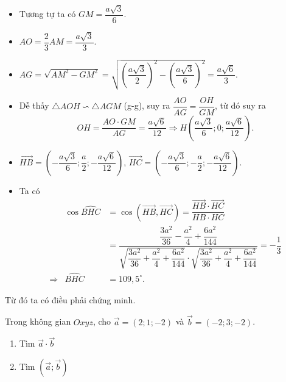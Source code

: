\begin{bt}
{\begin{itemize}
			\item Tương tự ta có $GM=\dfrac{a\sqrt{3}}{6}$.
			\item $AO = \dfrac{2}{3}AM = \dfrac{a\sqrt{3}}{3}$.
			\item $AG=\sqrt{AM^2-GM^2}=\sqrt{\left(\dfrac{a\sqrt{3}}{2}\right)^2-\left(\dfrac{a\sqrt{3}}{6}\right)^2}=\dfrac{a\sqrt{6}}{3}$.
			\item Dễ thấy $\triangle AOH \backsim \triangle AGM$ (g-g), suy ra $\dfrac{AO}{AG}=\dfrac{OH}{GM}$, từ đó suy ra 
			\[ OH = \dfrac{AO\cdot GM}{AG}=\dfrac{a\sqrt{6}}{12}\Rightarrow H\left(\dfrac{a\sqrt{3}}{6};0;\dfrac{a\sqrt{6}}{12}\right).\]
			\item $\overrightarrow{HB}=\left(-\dfrac{a\sqrt{3}}{6};\dfrac{a}{2};-\dfrac{a\sqrt{6}}{12}\right)$, $\overrightarrow{HC}=\left(-\dfrac{a\sqrt{3}}{6};-\dfrac{a}{2};-\dfrac{a\sqrt{6}}{12}\right)$.
			\item Ta có
			\begin{eqnarray*}
				& \cos \widehat{BHC} & =\cos \left(\overrightarrow{HB},\overrightarrow{HC}\right) = \dfrac{\overrightarrow{HB}\cdot \overrightarrow{HC}}{HB\cdot HC}\\
				& & = \dfrac{\dfrac{3a^2}{36}-\dfrac{a^2}{4}+\dfrac{6a^2}{144}}{\sqrt{\dfrac{3a^2}{36}+\dfrac{a^2}{4}+\dfrac{6a^2}{144}}\cdot \sqrt{\dfrac{3a^2}{36}+\dfrac{a^2}{4}+\dfrac{6a^2}{144}}} = -\dfrac{1}{3}\\
				\Rightarrow &  \widehat{BHC} & =109{,}5^\circ.
			\end{eqnarray*}
		\end{itemize}
		Từ đó ta có điều phải chứng minh.
	}
\end{bt}

\begin{bt}%
	Trong không gian $Oxyz$, cho $\overrightarrow{a}=(2;1;-2)$ và $\overrightarrow{b}=(-2;3;-2)$.
	\begin{enumerate}
		\item Tìm $\overrightarrow{a}\cdot\overrightarrow{b}$
		\item Tìm $(\overrightarrow{a};\overrightarrow{b})$
	\end{enumerate}
\end{bt}

